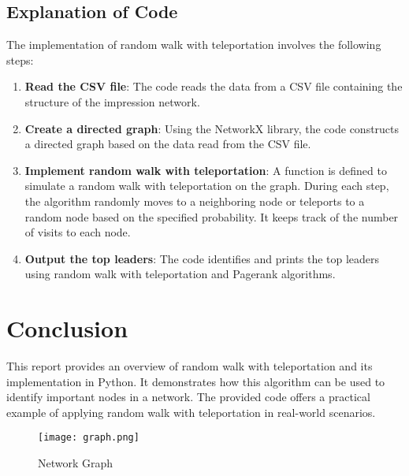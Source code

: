 \documentclass{article}
\begin{document}
\subsection{Explanation of Code}
The implementation of random walk with teleportation involves the following steps:

\begin{enumerate}
    \item \textbf{Read the CSV file}: The code reads the data from a CSV file containing the structure of the impression network.
    \item \textbf{Create a directed graph}: Using the NetworkX library, the code constructs a directed graph based on the data read from the CSV file.
    \item \textbf{Implement random walk with teleportation}: A function is defined to simulate a random walk with teleportation on the graph. During each step, the algorithm randomly moves to a neighboring node or teleports to a random node based on the specified probability. It keeps track of the number of visits to each node.
    \item \textbf{Output the top leaders}: The code identifies and prints the top leaders using random walk with teleportation and Pagerank algorithms.
\end{enumerate}

\section{Conclusion}
This report provides an overview of random walk with teleportation and its implementation in Python. It demonstrates how this algorithm can be used to identify important nodes in a network. The provided code offers a practical example of applying random walk with teleportation in real-world scenarios.

\begin{figure}[htbp]
    \centering
    \texttt{[image: graph.png]}
    \caption{Network Graph}
    \label{fig:network_graph}
\end{figure}
\end{document}
